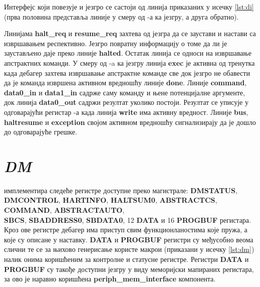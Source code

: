 Интерфејс који повезује  и језгро се састоји од линија приказаних у исечку \ref{lst:di} (прва половина представља линије у смеру од -а ка језгру, а друга обратно).



Линијама \textbf{halt\_req} и \textbf{resume\_req}  захтева од језгра да се заустави и настави са извршавањем респективно. Језгро повратну информацију о томе да ли је заустављено даје преко линије \textbf{halted}. Остатак линија се односи на извршавање апстрактних команди. У смеру од -a ка језгру линија \textbf{exec} је активна од тренутка када дебагер захтева извршавање апстрактне команде све док језгро не обавести  да је команда извршена активном вредношћу линије \textbf{done}. Линије \textbf{command}, \textbf{data0\_in} и \textbf{data1\_in} садрже саму команду и њене потенцијалне аргументе, док линија \textbf{data0\_out} садржи резултат уколико постоји. Резултат се уписује у одговарајући регистар -а када линија \textbf{write} има активну вредност.
Линије \textbf{bus}, \textbf{haltresume} и \textbf{exception} својом активном вредношћу сигнализирају да је дошло до одговарајуће грешке.\newpage

\section{\textit{\acrfull{DM}}}

 имплементира следеће регистре доступне преко  магистрале: \textbf{\acrshort{DMSTATUS}},\\ \textbf{\acrshort{DMCONTROL}}, \textbf{HARTINFO}, \textbf{\acrshort{HALTSUM}0}, \textbf{\acrshort{ABSTRACTCS}}, \textbf{COMMAND}, \textbf{ABSTRACTAUTO},\\ \textbf{\acrshort{SBCS}}, \textbf{\acrshort{SBADDRESS}0}, \textbf{\acrshort{SBDATA}0}, 12 \textbf{DATA} и 16 \textbf{\acrshort{PROGBUF}} регистара. Кроз ове регистре дебагер има приступ свим функционланостима које  пружа, а које су описане у наставку. \textbf{DATA} и \textbf{\acrshort{PROGBUF}} регистри су међусобно веома слични те се за њихово генерисање користе макрои (приказани у исечку \ref{lst:dm}) налик онима коришћеним за контролне и статусне регистре. Регистри \textbf{DATA} и \textbf{\acrshort{PROGBUF}} су такође доступни језгру у виду меморијски мапираних регистара, за ово је наравно коришћена \textbf{periph\_mem\_interface} компонента.

